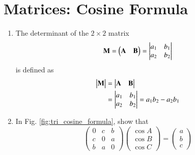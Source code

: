 \section{Matrices: Cosine Formula}
\begin{enumerate}[label=\thesection.\arabic*.,ref=\thesection.\theenumi]
\item The determinant of the $2 \times 2$ matrix 
\begin{align}  
  \mathbf{M} = \begin{pmatrix}\mathbf{A} & \mathbf{B}\end{pmatrix}=\begin{vmatrix}a_1 & b_1\\a_2 & b_2\end{vmatrix}
\end{align}
is defined as
\begin{align}
  \label{eq:det2d}
  \begin{vmatrix}\mathbf{M}\end{vmatrix} &= \begin{vmatrix}\mathbf{A} & \mathbf{B}\end{vmatrix} 
  \\
  &= \begin{vmatrix}a_1 & b_1\\a_2 & b_2\end{vmatrix} = a_1b_2 - a_2 b_1
\end{align}
%
\iffalse
\item Let 
\begin{align}
  \vec{A} = \myvec{a_1\\a_2 \\ a_3},\, 
  \vec{B} = \myvec{b_1\\b_2 \\ b_3},\,
  \vec{C} = \myvec{c_1\\c_2 \\ c_3}
\end{align}
and 
\begin{align}
  \vec{A}_{ij} = \myvec{a_i\\a_j}, \,
  \vec{B}_{ij} = \myvec{b_i\\b_j}, \,
  \vec{C}_{ij} = \myvec{c_i\\c_j}. 
\end{align}
Then, \begin{align}  
	\mydet{\vec{A} & \vec{B} & \vec{C}} = a_1 \mydet{\vec{B}_{23} & \vec{C}_23} +a_2 \mydet{\vec{C}_{23} & \vec{A}_{23}} +a_3\mydet{\vec{A}_{23} & \vec{B}_{23}} 
\end{align}
\fi

\item
In Fig. \ref{fig:tri_cosine_formula}, show that
%
\begin{equation}
\label{eq:tri_cos_mat}
\begin{pmatrix}
0 & c & b \\
c & 0 & a \\
b & a & 0
\end{pmatrix}
\begin{pmatrix}
\cos A \\
\cos B \\
\cos C
\end{pmatrix}
= 
\begin{pmatrix}
a\\
b\\
c
\end{pmatrix}
\end{equation}
%
%
\begin{figure}[!ht]
	\begin{center}
		

\end{center}
\end{figure}
\end{enumerate}
